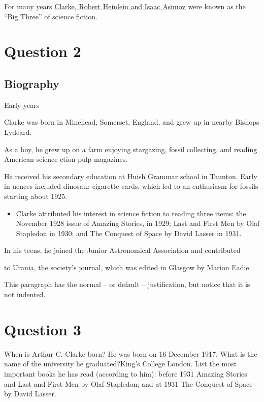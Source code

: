 \documentclass[a4paper,12pt]{article}
\begin{document}
For many years \underline{Clarke, Robert Heinlein and Isaac Asimov} were known as the ``Big Three'' of science fiction.
\pagebreak

\section{Question 2}
\subsection*{\centering Biography}
\begin{center}
Early years
\end{center}

Clarke was born in Minehead, Somerset, England, and grew up in nearby Bishops Lydeard.
\begin{flushright}
As a boy, he grew up on a farm enjoying stargazing, fossil collecting, and reading American science  ction pulp magazines.
\end{flushright}
\begin{flushleft}
He received his secondary education at Huish Grammar school in Taunton. Early in uences included dinosaur cigarette cards, which led to an enthusiasm for fossils starting about 1925.
\end{flushleft}

\begin{itemize}
\item   Clarke attributed his interest in science fiction to reading three items: the November 1928 issue of Amazing Stories, in 1929; Last and First Men by Olaf Stapledon in 1930; and The Conquest of Space by David Lasser in 1931.
\end{itemize}
{\raggedright In his teens, he joined the Junior Astronomical Association and contributed \par}
{\raggedleft to Urania, the society's journal, which was edited in Glasgow by Marion Eadie.\par}

\noindent This paragraph has the normal -- or default -- justification, but notice that it is not indented.
\pagebreak

\section{Question 3}
{\large When is Arthur C. Clarke born? \newline He was born on 16 December 1917.\newline
What is the name of the university he graduated?\linebreak King's College London.\newline
List the most important books he has read (according to him):
before 1931  Amazing Stories and Last and First Men by Olaf Stapledon; and at 1931  The Conquest of Space by David Lasser.\par}
\end{document}
